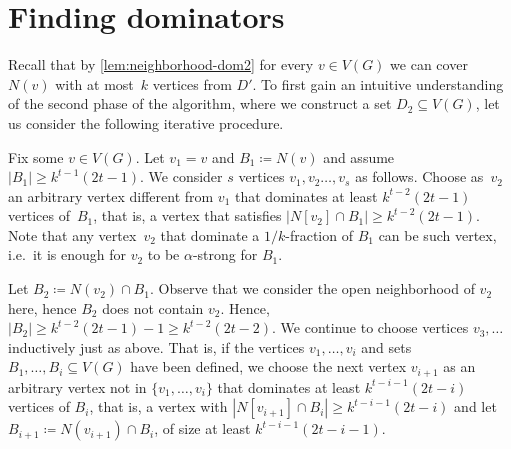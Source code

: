 
\section{Finding dominators}


Recall that by \cref{lem:neighborhood-dom2} for every $v\in V(G)$ we can
cover $N(v)$ with at most~$k$ vertices from $D'$.
To first gain an intuitive understanding of the second phase of the
algorithm, where we construct a set $D_2\subseteq V(G)$, let us consider the
following iterative procedure.

Fix some $v\in V(G)$. Let $v_1=v$ and $B_1\coloneqq N(v)$
and assume $|B_1|\geq k^{t-1}(2t{-}1)$. We consider $s$
vertices $v_1,v_2\ldots, v_s$ as follows.
Choose as~$v_2$ an arbitrary vertex different from $v_1$
that dominates at least $k^{t-2}(2t-1)$ vertices of~$B_1$, that is,
a vertex that satisfies $|N[v_2]\cap B_1|\geq k^{t-2}(2t-1)$.
Note that any vertex~$v_2$ that dominate a $1/k$-fraction of $B_1$ can
be such vertex, i.e.~it is enough for $v_2$ to be $\alpha$-strong for $B_1$.

Let $B_2\coloneqq N(v_2)\cap B_1$. Observe that we consider
the open neighborhood of $v_2$ here, hence $B_2$ does
not contain $v_2$. Hence, $|B_2|\geq k^{t-2}(2t-1)-1\geq
k^{t-2}(2t-2)$.
We continue to choose vertices $v_3,\ldots$ inductively
just as above. That is, if the vertices $v_1,\ldots,v_i$ and sets
$B_1,\ldots, B_i\subseteq V(G)$ have been defined, we choose
the next vertex $v_{i+1}$ as an arbitrary vertex not in $\{v_1,\ldots,
v_i\}$ that dominates
at least $k^{t-i-1}(2t-i)$ vertices of $B_i$, that is, a vertex with
$|N[v_{i+1}]\cap B_i| \ge k^{t-i-1}(2t-i)$ and let
$B_{i+1}\coloneqq N(v_{i+1})\cap B_i$, of size at least
$k^{t-i-1}(2t-i-1)$.



